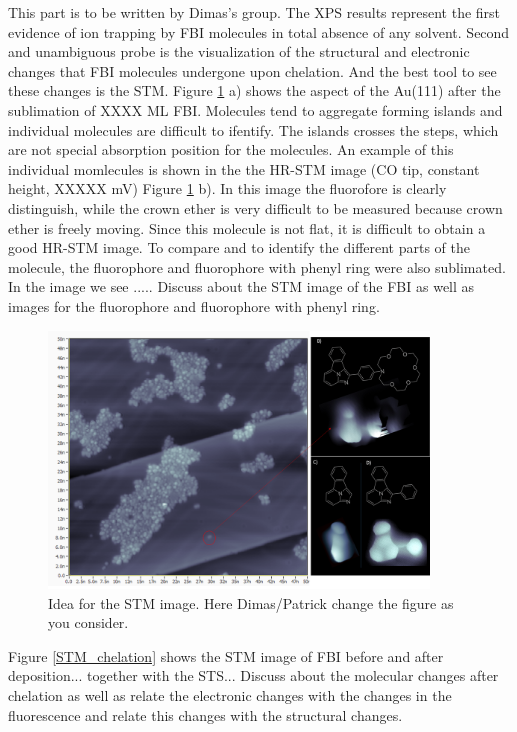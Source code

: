 \documentclass[aps,prl,reprint,longbibliography,superscriptaddress, english]{revtex4-1}
\newcommand{\completar}[1]{{\color{red} #1}}
\begin{document}
\completar{This part is to be written by Dimas's group.  } The XPS results represent the first evidence of ion trapping by FBI molecules in total absence of any solvent. Second and unambiguous probe is the visualization of the structural and electronic changes that FBI molecules undergone upon chelation. And the best tool to see these changes is the STM. Figure \ref{STM_FBI_fluorophore} a) shows the aspect of the Au(111) after the sublimation of XXXX ML FBI. Molecules tend to aggregate forming islands and individual molecules are difficult to ifentify. The islands crosses the steps, which are not special absorption position for the molecules. An example of this individual momlecules is shown in the the HR-STM image (CO tip, constant height, XXXXX mV) Figure \ref{STM_FBI_fluorophore} b). In this image the fluorofore is clearly distinguish, while the crown ether is very difficult to be measured because crown ether is freely moving. 
Since this molecule is not flat, it is difficult to obtain a good HR-STM image. To compare and to identify the different parts of the molecule, the fluorophore and fluorophore with phenyl ring were also sublimated. In the image we see ..... \completar{Discuss about the STM image of the FBI as well as images for the fluorophore and fluorophore with phenyl ring.}

\begin{figure}[ht!]
	\includegraphics[width=0.9\textwidth]{figures/STM_FBI_fluoroforos.png}
	\caption{\label{STM_FBI_fluorophore} 
    Idea for the STM image. Here Dimas/Patrick change the figure as you consider. }
\end{figure}  

Figure \ref{STM_chelation} shows the STM image of FBI before and after \Bapp deposition... together with the STS... \completar{Discuss about the molecular changes after chelation as well as relate the electronic changes with the changes in the fluorescence and relate this changes with the structural changes.}
\end{document}
